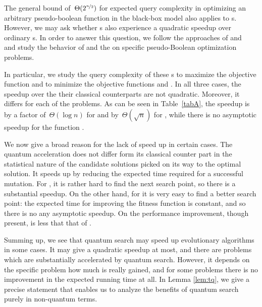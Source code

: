 The general bound of~$\Theta(2^{\nicefrac{n}{2}})$ for expected query complexity in optimizing an arbitrary pseudo-boolean function in the black-box model also applies to \qrsh{}s. However, we may ask whether \qrsh{}s also experience a quadratic speedup over ordinary \rsh{}s. In order to answer this question, we follow the approaches of \cite{BeyerSW02} and~\cite{DJWoneone} and study the behavior of \qrls and the \qooea on specific pseudo-Boolean optimization problems.

In particular, we study the query complexity of these \qrsh{}s to maximize the objective function \leadingones and to minimize the objective functions \onemax and \discrepancy. In all three cases, the speedup over the their classical counterparts are not quadratic. Moreover, it differs for each of the problems. As can be seen in Table~\ref{tabA}, the speedup is by a factor of~$\Theta(\log n)$ for \onemax and by~$\Theta(\sqrt{n})$ for \leadingones, while there is no asymptotic speedup for the function \discrepancy.

We now give a broad reason for the lack of speed up in certain cases. The quantum acceleration does not differ form its classical counter part in the statistical nature of the candidate solutions picked on its way to the optimal solution. It speeds up by reducing the expected time required for a successful mutation. For \leadingones, it is rather hard to find the next search point, so there is a substantial speedup. On the other hand, for \discrepancy it is very easy to find a better search point: the expected time for improving the fitness function is constant, and so there is no any asymptotic speedup. On \onemax the performance improvement, though present, is less that that of \leadingones.

Summing up, we see that quantum search may speed up evolutionary algorithms in some cases. It may give a quadratic speedup at most, and there are problems which are substantially accelerated by quantum search. However, it depends on the specific problem how much is really gained, and for some problems there is no improvement in the expected running time at all. In Lemma \ref{lem:tq}, we give a precise statement that enables us to analyze the benefits of quantum search purely in non-quantum terms.





